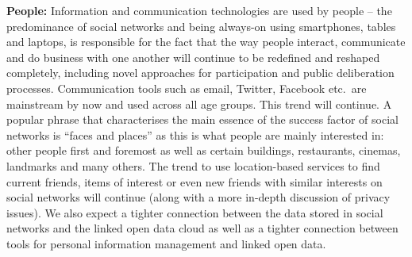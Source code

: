 \documentclass[10pt, plain]{../../metanetpaper}
\begin{document}
\begin{multicols}{2}
\textbf{People:} Information and communication technologies are used by people -- the predominance of social networks and being always-on using smartphones, tables and laptops, is responsible for the fact that the way people interact, communicate and do business with one another will continue to be redefined and reshaped completely, including novel approaches for participation and public deliberation processes. Communication tools such as email, Twitter, Facebook etc.~are mainstream by now and used across all age groups. This trend will continue. A popular phrase that characterises the main essence of the success factor of social networks is ``faces and places'' as this is what people are mainly interested in: other people first and foremost as well as certain buildings, restaurants, cinemas, landmarks and many others. The trend to use location-based services to find current friends, items of interest or even new friends with similar interests on social networks will continue (along with a more in-depth discussion of privacy issues). We also expect a tighter connection between the data stored in social networks and the linked open data cloud as well as a tighter connection between tools for personal information management and linked open data.


\end{multicols}
\end{document}
